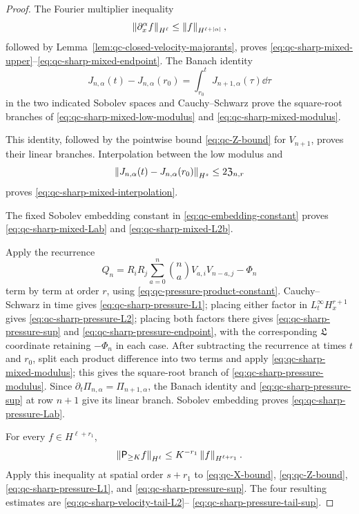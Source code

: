 {\begin{proof}
The Fourier multiplier inequality
\[
 \left\lVert \partial_x^\alpha f\right\rVert_{H^\ell}
 \le\left\lVert f\right\rVert_{H^{\ell+|\alpha|}},
\]
followed by Lemma~\ref{lem:qc-closed-velocity-majorants}, proves
\eqref{eq:qc-sharp-mixed-upper}--\eqref{eq:qc-sharp-mixed-endpoint}.
The Banach identity
\[
 J_{n,\alpha}(t)-J_{n,\alpha}(r_0)
 =\int_{r_0}^tJ_{n+1,\alpha}(\tau)\dd\tau
\]
in the two indicated Sobolev spaces and Cauchy--Schwarz prove the
square-root branches of \eqref{eq:qc-sharp-mixed-low-modulus} and
\eqref{eq:qc-sharp-mixed-modulus}.
\begin{samepage}
This identity, followed by the
pointwise bound \eqref{eq:qc-Z-bound} for \(V_{n+1}\), proves their linear
branches.  Interpolation between the low modulus
and
\[
 \left\lVert J_{n,\alpha}(t)-J_{n,\alpha}(r_0)\right\rVert_{H^s}
 \le2\mathfrak Z_{n,r}
\]
proves \eqref{eq:qc-sharp-mixed-interpolation}.
\end{samepage}
The fixed Sobolev embedding constant in \eqref{eq:qc-embedding-constant} proves
\eqref{eq:qc-sharp-mixed-Lab} and \eqref{eq:qc-sharp-mixed-L2b}.

Apply the recurrence
\[
 Q_n=R_iR_j\sum_{a=0}^{n}\binom naV_{a,i}V_{n-a,j}
 -\Phi_n
\]
term by term at order \(r\), using
\eqref{eq:qc-pressure-product-constant}.  Cauchy--Schwarz in time gives
\eqref{eq:qc-sharp-pressure-L1}; placing either factor in
\(L_t^\infty H_x^{r+1}\) gives
\eqref{eq:qc-sharp-pressure-L2}; placing both factors there gives
\eqref{eq:qc-sharp-pressure-sup} and
\eqref{eq:qc-sharp-pressure-endpoint}, with the corresponding
\(\mathfrak L\) coordinate retaining \(-\Phi_n\) in each case.  After subtracting the recurrence at
times \(t\) and \(r_0\), split each product difference into two terms and
apply \eqref{eq:qc-sharp-mixed-modulus}; this gives the square-root branch
of \eqref{eq:qc-sharp-pressure-modulus}.  Since
\(\partial_t\Pi_{n,\alpha}=\Pi_{n+1,\alpha}\), the Banach identity and
\eqref{eq:qc-sharp-pressure-sup} at row \(n+1\) give its linear branch.
Sobolev embedding proves
\eqref{eq:qc-sharp-pressure-Lab}.

For every \(f\in H^{\ell+r_1}\),
\[
 \left\lVert \mathsf P_{\ge K}f\right\rVert_{H^\ell}
 \le K^{-r_1}\left\lVert f\right\rVert_{H^{\ell+r_1}}.
\]
Apply this inequality at spatial order \(s+r_1\) to
\eqref{eq:qc-X-bound}, \eqref{eq:qc-Z-bound},
\eqref{eq:qc-sharp-pressure-L1}, and
\eqref{eq:qc-sharp-pressure-sup}.  The four resulting estimates are
\eqref{eq:qc-sharp-velocity-tail-L2}--%
\eqref{eq:qc-sharp-pressure-tail-sup}.


\end{proof}}
